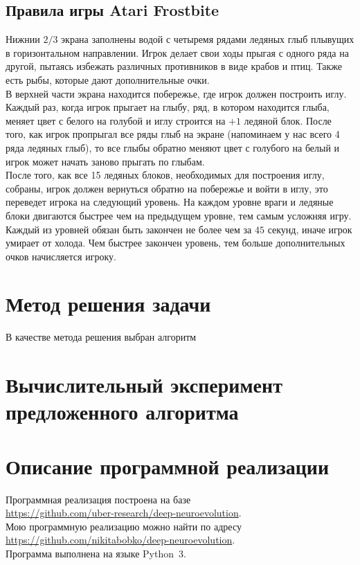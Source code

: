 \documentclass[12pt]{article}
\begin{document}
    \subsection{Правила игры Atari Frostbite}
    Нижнии $2/3$ экрана заполнены водой с четыремя рядами ледяных глыб плывущих в горизонтальном направлении. Игрок делает свои ходы прыгая с одного ряда на другой, пытаясь избежать различных противников в виде крабов и птиц. Также есть рыбы, которые дают дополнительные очки. \\

    В верхней части экрана находится побережье, где игрок должен построить иглу. Каждый раз, когда игрок прыгает на глыбу, ряд, в котором находится глыба, меняет цвет с белого на голубой и иглу строится на $+1$ ледяной блок. После того, как игрок пропрыгал все ряды глыб на экране (напоминаем у нас всего 4 ряда ледяных глыб), то все глыбы обратно меняют цвет с голубого на белый и игрок может начать заново прыгать по глыбам. \\

    После того, как все 15 ледяных блоков, необходимых для построения иглу, собраны, игрок должен вернуться обратно на побережье и войти в иглу, это переведет игрока на следующий уровень. На каждом уровне враги и ледяные блоки двигаются быстрее чем на предыдущем уровне, тем самым усложняя игру. \\

    Каждый из уровней обязан быть закончен не более чем за $45$ секунд, иначе игрок умирает от холода. Чем быстрее закончен уровень, тем больше дополнительных очков начисляется игроку.

\section{Метод решения задачи}
    В качестве метода решения выбран алгоритм 

\section{Вычислительный эксперимент предложенного алгоритма}

\section{Описание программной реализации}
    Программная реализация построена на базе \\
    \url{https://github.com/uber-research/deep-neuroevolution}. \\
    Мою программную реализацию можно найти по адресу \\
    \url{https://github.com/nikitabobko/deep-neuroevolution}. \\
    Программа выполнена на языке Python~3.\\
\end{document}
